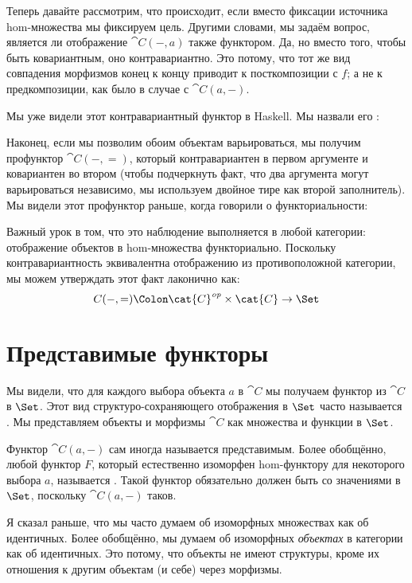 
Теперь давайте рассмотрим, что происходит, если вместо фиксации источника
hom-множества мы фиксируем цель. Другими словами, мы задаём вопрос, является ли
отображение $\cat{C}(-, a)$ также функтором. Да, но вместо того, чтобы быть ковариантным, оно
контравариантно. Это потому, что тот же вид совпадения морфизмов конец
к концу приводит к посткомпозиции с $f$; а не к
предкомпозиции, как было в случае с $\cat{C}(a, -)$.

Мы уже видели этот контравариантный функтор в Haskell. Мы назвали его
:


Наконец, если мы позволим обоим объектам варьироваться, мы получим профунктор
$\cat{C}(-, =)$, который контравариантен в первом аргументе и
ковариантен во втором (чтобы подчеркнуть факт, что два аргумента
могут варьироваться независимо, мы используем двойное тире как второй заполнитель).
Мы видели этот профунктор раньше, когда говорили о функториальности:

Важный урок в том, что это наблюдение выполняется в любой категории:
отображение объектов в hom-множества функториально. Поскольку контравариантность
эквивалентна отображению из противоположной категории, мы можем утверждать этот
факт лаконично как:
\[C(-, =) \Colon \cat{C}^\mathit{op} \times \cat{C} \to \Set\]

\section{Представимые функторы}

Мы видели, что для каждого выбора объекта $a$ в $\cat{C}$
мы получаем функтор из $\cat{C}$ в $\Set$. Этот вид
структуро-сохраняющего отображения в $\Set$ часто называется
. Мы представляем объекты и морфизмы
$\cat{C}$ как множества и функции в $\Set$.

Функтор $\cat{C}(a, -)$ сам иногда называется представимым.
Более обобщённо, любой функтор $F$, который естественно изоморфен
hom-функтору для некоторого выбора $a$, называется
. Такой функтор обязательно должен быть
со значениями в $\Set$, поскольку $\cat{C}(a, -)$ таков.

Я сказал раньше, что мы часто думаем об изоморфных множествах как об идентичных. Более
обобщённо, мы думаем об изоморфных \emph{объектах} в категории как об
идентичных. Это потому, что объекты не имеют структуры, кроме их
отношения к другим объектам (и себе) через морфизмы.

